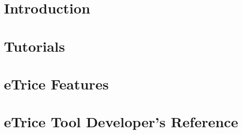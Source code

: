 \documentclass[a4paper,oneside,10pt]{book}
\title{\Huge \eTrice}
\author{\eTrice{} committers and contributors}
\begin{document}
\maketitle

\tableofcontents

\chapter{Introduction}

%
%

\chapter{Tutorials}

%



%

%
%
%

\chapter{eTrice{} Features}

%

%
%
%

%

\chapter{eTrice{} Tool Developer's Reference}


\end{document}
